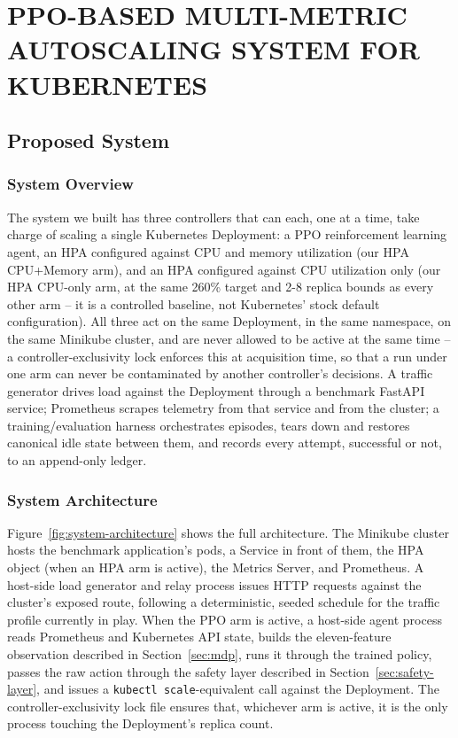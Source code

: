 \chapter{PPO-BASED MULTI-METRIC AUTOSCALING SYSTEM FOR KUBERNETES}
\label{ch:methodology}

\section{Proposed System}
\label{sec:proposed-system}

\subsection{System Overview}

The system we built has three controllers that can each, one at a time, take
charge of scaling a single Kubernetes Deployment: a PPO reinforcement
learning agent, an HPA configured against CPU and memory utilization (our
HPA CPU+Memory arm), and an HPA configured against CPU utilization only
(our HPA CPU-only arm, at the same 260\% target and 2-8 replica bounds as
every other arm -- it is a controlled baseline, not Kubernetes' stock
default configuration). All three act on the same Deployment, in the same
namespace, on the same Minikube cluster, and are never allowed to be active
at the same time -- a controller-exclusivity lock enforces this at
acquisition time, so that a run under one arm can never be contaminated by
another controller's decisions. A traffic generator drives load against the
Deployment through a benchmark FastAPI service; Prometheus scrapes
telemetry from that service and from the cluster; a training/evaluation
harness orchestrates episodes, tears down and restores canonical idle state
between them, and records every attempt, successful or not, to an
append-only ledger.

\subsection{System Architecture}

Figure~\ref{fig:system-architecture} shows the full architecture. The
Minikube cluster hosts the benchmark application's pods, a Service in front
of them, the HPA object (when an HPA arm is active), the Metrics Server, and
Prometheus. A host-side load generator and relay process issues HTTP
requests against the cluster's exposed route, following a deterministic,
seeded schedule for the traffic profile currently in play. When the PPO arm
is active, a host-side agent process reads Prometheus and Kubernetes API
state, builds the eleven-feature observation described in
Section~\ref{sec:mdp}, runs it through the trained policy, passes the raw
action through the safety layer described in Section~\ref{sec:safety-layer},
and issues a \texttt{kubectl scale}-equivalent call against the Deployment.
The controller-exclusivity lock file ensures that, whichever arm is active,
it is the only process touching the Deployment's replica count.

